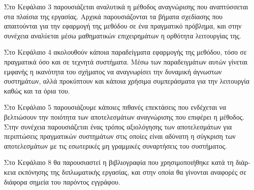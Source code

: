 Στο Κεφάλαιο 3 παρουσιάζεται αναλυτικά η μέθοδος αναγνώρισης που αναπτύσσεται στα πλαίσια της εργασίας. Αρχικά παρουσιάζονται τα βήματα σχεδίασης που απαιτούνται για την εφαρμογή της μεθόδου σε ένα πραγματικό πρόβλημα, και στην συνέχεια αναλύεται μέσω μαθηματικών επιχειρημάτων η ορθότητα λειτουργίας της.

Στο Κεφάλαιο 4 ακολουθούν κάποια παραδείγματα εφαρμογής της μεθόδου, τόσο σε πραγματικά όσο και σε τεχνητά συστήματα. Μέσω των παραδειγμάτων αυτών γίνεται εμφανής η ικανότητα του σχήματος να αναγνωρίσει την δυναμική άγνωστων συστημάτων, αλλά προκύπτουν και κάποια χρήσιμα συμπεράσματα για την λειτουργία καθώς και τα όρια του.

Στο Κεφάλαιο 5 παρουσιάζουμε κάποιες πιθανές επεκτάσεις που ενδέχεται να βελτιώσουν την ποιότητα των αποτελεσμάτων αναγνώρισης που επιφέρει η μέθοδος. Στην συνέχεια παρουσιάζεται ένας τρόπος αξιολόγησης των αποτελεσμάτων για περιπτώσεις πραγματικών συστημάτων στις οποίες είναι αδύνατη η σύγκριση των αποτελεσμάτων με τις εσωτερικές μη γραμμικές συναρτήσεις του συστήματος.

Στο Κεφάλαιο 8 θα παρουσιαστεί η βιβλιογραφία που χρησιμοποιήθηκε κατά τη διάρ-
κεια εκπόνησης της διπλωματικής εργασίας, και στην οποία θα γίνονται αναφορές σε
διάφορα σημεία του παρόντος εγγράφου.

